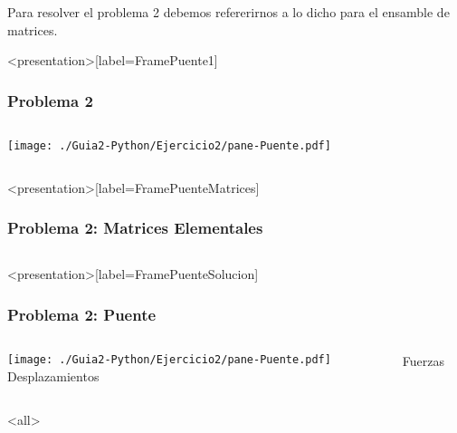 Para resolver el problema 2 debemos refererirnos a lo dicho para el
ensamble de matrices.

\mode*
\begin{frame}<presentation>[label=FramePuente1]
    \frametitle{Problema 2}
    \begin{columns}
        \texttt{[image: ./Guia2-Python/Ejercicio2/pane-Puente.pdf]}
        \begin{codeblock}
            
        \end{codeblock}
    \end{columns}
\end{frame}

\begin{frame}<presentation>[label=FramePuenteMatrices]
    \frametitle{Problema 2: Matrices Elementales}
    \begin{columns}
        \begin{codeblock}
            
        \end{codeblock}
        \begin{codeblock}
        
        \end{codeblock}
    \end{columns}
\end{frame}

\begin{frame}<presentation>[label=FramePuenteSolucion]
    \frametitle{Problema 2: Puente}
    \begin{columns}
            \texttt{[image: ./Guia2-Python/Ejercicio2/pane-Puente.pdf]}
        Desplazamientos

        \begin{codeblock}
            
        \end{codeblock}
        Fuerzas

        \begin{codeblock}
            
        \end{codeblock}
    \end{columns}
\end{frame}
\mode<all>
